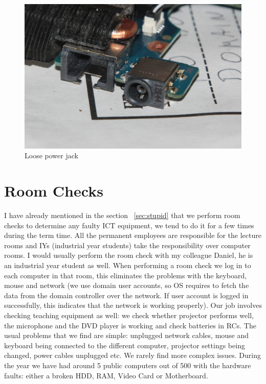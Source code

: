 \documentclass[10pt,a4paper,headinclude=true,twoside]{report}
\begin{document}
\begin{figure}[H]
\centering
\centerline{\includegraphics[scale=0.4]{./powerJack}}
\caption{Loose power jack}
\label{fig:power jack}
\end{figure}

\section{Room Checks}
I have already mentioned in the section ~\ref{sec:stupid} that we perform room checks to determine any faulty ICT equipment, we tend to do it for a few times during the term time. All the permanent employees are responsible for the lecture rooms and IYs (industrial year students) take the responsibility over computer rooms. I would usually perform the room check with my colleague Daniel, he is an industrial year student as well. When performing a room check we log in to each computer in that room, this eliminates the problems with the keyboard, mouse and network (we use domain user accounts, so OS requires to fetch the data from the domain controller over the network. If user account is logged in successfully, this indicates that the network is working properly). Our job involves checking teaching equipment as well: we check whether projector performs well, the microphone and the DVD player is working and check batteries in RCs. The usual problems that we find are simple: unplugged network cables, mouse and keyboard being connected to the different computer, projector settings being changed, power cables unplugged etc. We rarely find more complex issues. During the year we have had around 5 public computers out of 500 with the hardware faults: either a broken HDD, RAM, Video Card or Motherboard. 
\end{document}
